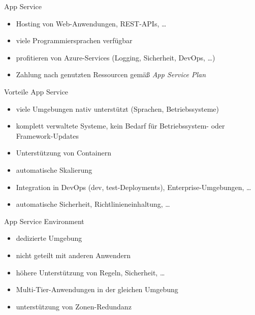 \begin{flashcard}[]{App Service}
  \begin{itemize}
    \item Hosting von Web-Anwendungen, REST-APIs, \ldots
    \item viele Programmiersprachen verfügbar
    \item profitieren von Azure-Services (Logging, Sicherheit, DevOps, \ldots)
    \item Zahlung nach genutzten Ressourcen gemäß \emph{App Service Plan}
  \end{itemize}
\end{flashcard}

\begin{flashcard}[]{Vorteile App Service}
  \begin{itemize}
    \item viele Umgebungen nativ unterstützt (Sprachen, Betriebssysteme)
    \item komplett verwaltete Systeme, kein Bedarf für Betriebssystem- oder Framework-Updates
    \item Unterstützung von Containern
    \item automatische Skalierung
    \item Integration in DevOps (dev, test-Deployments), Enterprise-Umgebungen, \ldots
    \item automatische Sicherheit, Richtlinieneinhaltung, \ldots
  \end{itemize}
\end{flashcard}

\begin{flashcard}[]{App Service Environment}
  \begin{itemize}
    \item dedizierte Umgebung
    \item nicht geteilt mit anderen Anwendern
    \item höhere Unterstützung von Regeln, Sicherheit, \ldots
    \item Multi-Tier-Anwendungen in der gleichen Umgebung
    \item unterstützung von Zonen-Redundanz
  \end{itemize}
\end{flashcard}

